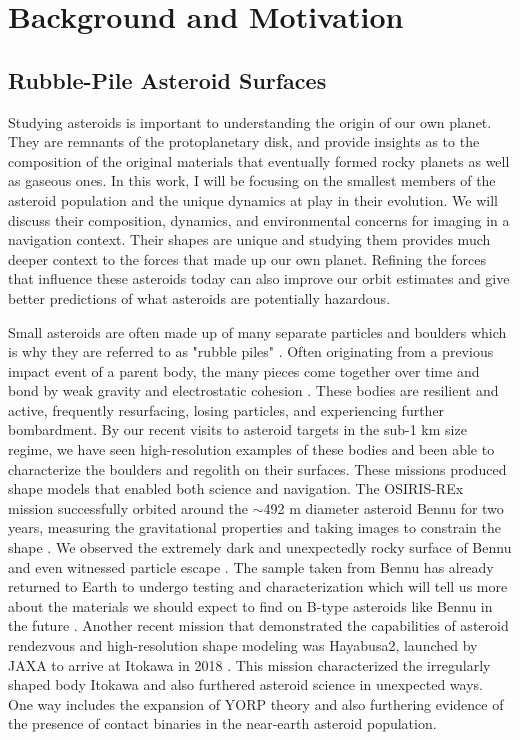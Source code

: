 \chapter{Background and Motivation}
\label{introchap}
\section{Rubble-Pile Asteroid Surfaces} 
Studying asteroids is important to understanding the origin of our own planet. They are remnants of the protoplanetary disk, and provide insights as to the composition of the original materials that eventually formed rocky planets as well as gaseous ones. In this work, I will be focusing on the smallest members of the asteroid population and the unique dynamics at play in their evolution. We will discuss their composition, dynamics, and environmental concerns for imaging in a navigation context. Their shapes are unique and studying them provides much deeper context to the forces that made up our own planet. Refining the forces that influence these asteroids today can also improve our orbit estimates and give better predictions of what asteroids are potentially hazardous. 

Small asteroids are often made up of many separate particles and boulders which is why they are referred to as "rubble piles" \citep{Scheeres2018}. Often originating from a previous impact event of a parent body, the many pieces come together over time and bond by weak gravity and electrostatic cohesion \citep{Walsh2018}. These bodies are resilient and active, frequently resurfacing, losing particles, and experiencing further bombardment. By our recent visits to asteroid targets in the sub-1 km size regime, we have seen high-resolution examples of these bodies and been able to characterize the boulders and regolith on their surfaces. These missions produced shape models that enabled both science and navigation. The OSIRIS-REx mission successfully orbited around the $\sim$492 m diameter asteroid Bennu for two years, measuring the gravitational properties and taking images to constrain the shape \citep{Scheeres2019}. We observed the extremely dark and unexpectedly rocky surface of Bennu and even witnessed particle escape \citep{Hergenrother2019}. The sample taken from Bennu has already returned to Earth to undergo testing and characterization which will tell us more about the materials we should expect to find on B-type asteroids like Bennu in the future \citep{Lauretta2023}. Another recent mission that demonstrated the capabilities of asteroid rendezvous and high-resolution shape modeling was Hayabusa2, launched by JAXA to arrive at Itokawa in 2018 \citep{Watanabe2019}. This mission characterized the irregularly shaped body Itokawa and also furthered asteroid science in unexpected ways. One way includes the expansion of YORP theory and also furthering evidence of the presence of contact binaries in the near-earth asteroid population. 

